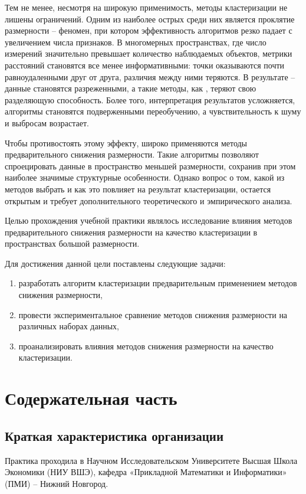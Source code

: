     Тем не менее, несмотря на широкую применимость, методы кластеризации не лишены ограничений. Одним из наиболее острых среди них является проклятие размерности -- феномен, при котором эффективность алгоритмов резко падает с увеличением числа признаков. В многомерных пространствах, где число измерений значительно превышает количество наблюдаемых объектов, метрики расстояний становятся все менее информативными: точки оказываются почти равноудаленными друг от друга, различия между ними теряются. В результате -- данные становятся разреженными, а такие методы, как \kmeans{}, теряют свою разделяющую способность. Более того, интерпретация результатов усложняется, алгоритмы становятся подверженными переобучению, а чувствительность к шуму и выбросам возрастает.

    Чтобы противостоять этому эффекту, широко применяются методы предварительного снижения размерности. Такие алгоритмы позволяют спроецировать данные в пространство меньшей размерности, сохранив при этом наиболее значимые структурные особенности. Однако вопрос о том, какой из методов выбрать и как это повлияет на результат кластеризации, остается открытым и требует дополнительного теоретического и эмпирического анализа.

    Целью прохождения учебной практики являлось исследование влияния методов предварительного снижения размерности на качество кластеризации в пространствах большой размерности.

    Для достижения данной цели поставлены следующие задачи:
    \begin{enumerate}
    \item разработать алгоритм кластеризации предварительным применением методов снижения размерности,
    \item провести экспериментальное сравнение методов снижения размерности на различных наборах данных,
    \item проанализировать влияния методов снижения размерности на качество кластеризации.
    \end{enumerate}


\section{Содержательная часть}

    \subsection{Краткая характеристика организации}
        Практика проходила в Научном Исследовательском Университете Высшая Школа Экономики (НИУ ВШЭ), кафедра «Прикладной Математики и Информатики» (ПМИ) – Нижний Новгород.

